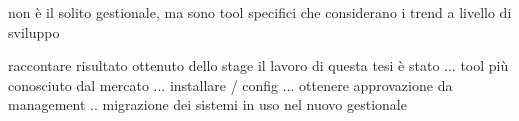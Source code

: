 

non è il solito gestionale, ma sono tool specifici che considerano i trend a livello di sviluppo

raccontare risultato ottenuto dello stage
il lavoro di questa tesi è stato ... tool più conosciuto dal mercato ... installare / config ... 
ottenere approvazione da management .. migrazione dei sistemi in uso nel nuovo gestionale